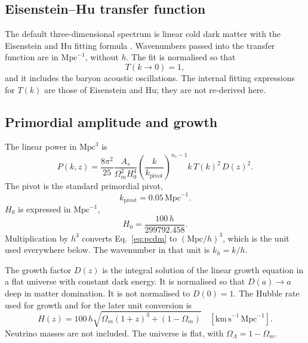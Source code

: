 \documentclass[11pt]{article}
\begin{document}
\subsection{Eisenstein--Hu transfer function}

The default three-dimensional spectrum is linear cold dark matter with the Eisenstein and Hu fitting formula \cite{Eisenstein:1997ik}. Wavenumbers passed into the transfer function are in $\mathrm{Mpc}^{-1}$, without $h$. The fit is normalised so that
\begin{equation}
T(k\to 0) = 1,
\end{equation}
and it includes the baryon acoustic oscillations. The internal fitting expressions for $T(k)$ are those of Eisenstein and Hu; they are not re-derived here.

\subsection{Primordial amplitude and growth}

The linear power in $\mathrm{Mpc}^{3}$ is
\begin{equation}
\label{eq:pcdm}
P(k,z)
=
\frac{8\pi^{2}}{25}
\frac{A_s}{\Omega_m^{2} H_0^{4}}
\left(\frac{k}{k_\mathrm{pivot}}\right)^{n_s-1}
k\,T(k)^{2}\,D(z)^{2}.
\end{equation}
The pivot is the standard primordial pivot,
\begin{equation}
k_\mathrm{pivot} = 0.05\,\mathrm{Mpc}^{-1}.
\end{equation}
$H_0$ is expressed in $\mathrm{Mpc}^{-1}$,
\begin{equation}
H_0 = \frac{100\,h}{299792.458}.
\end{equation}
Multiplication by $h^{3}$ converts Eq.~\eqref{eq:pcdm} to $(\mathrm{Mpc}/h)^{3}$, which is the unit used everywhere below. The wavenumber in that unit is $k_h = k/h$.

The growth factor $D(z)$ is the integral solution of the linear growth equation in a flat universe with constant dark energy. It is normalised so that $D(a)\to a$ deep in matter domination. It is not normalised to $D(0)=1$. The Hubble rate used for growth and for the later unit conversion is
\begin{equation}
\label{eq:hubble}
H(z) = 100\,h\sqrt{\Omega_m(1+z)^{3}+(1-\Omega_m)}
\quad[\mathrm{km\,s}^{-1}\,\mathrm{Mpc}^{-1}].
\end{equation}
Neutrino masses are not included. The universe is flat, with $\Omega_\Lambda = 1-\Omega_m$.
\end{document}
